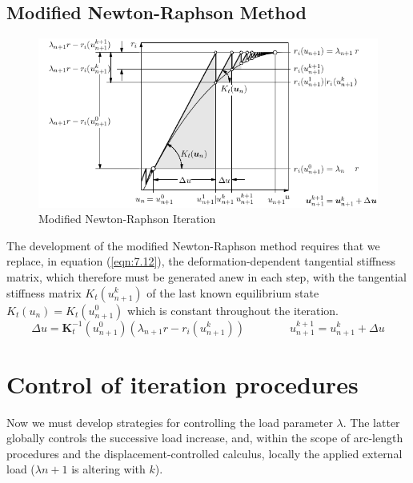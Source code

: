 \subsection{Modified Newton-Raphson Method}
\begin{figure}[H]
    \centering
    \includegraphics[scale=0.55]{Figure2/Chap3/Modified Newton-Raphson Iteration.png}
    \caption{Modified Newton-Raphson Iteration}
    \label{fig:7.3}
\end{figure}

The development of the modified Newton-Raphson method requires that we replace, in
equation (\ref{eqn:7.12}), the deformation-dependent tangential stiffness matrix, which therefore must be generated anew in each step, with the tangential stiffness matrix $K_t (u^ k_{n+1} )$ of the last known equilibrium state $K_t (u _n ) = K_t (u^0_{ n+1} )$ which is constant throughout the iteration.
\begin{equation}
 \Delta u=\mathbf{K}_{t}^{-1}\left(u_{n+1}^{0}\right)\left(\lambda_{n+1} r-r_{i}\left(u_{n+1}^{k}\right)\right) \qquad  \qquad u_{n+1}^{k+1}=u_{n+1}^{k}+\Delta u
 \label{eqn:7.14} 
\end{equation}
\section{Control of iteration procedures}
Now we must develop strategies for controlling the load
parameter $\lambda$. The latter globally controls the successive load increase, and, within the scope of
arc-length procedures and the displacement-controlled calculus, locally the applied external load
($\lambda n+1$ is altering with $k$).


